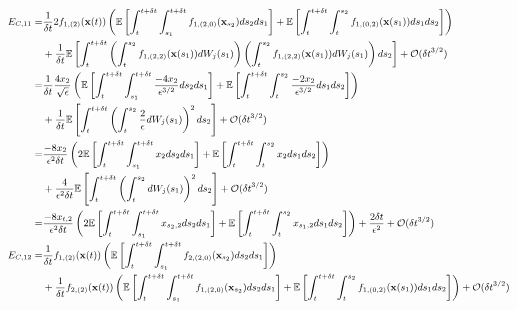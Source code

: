 \begin{equation}
\small
\begin{aligned}
E_{C,11}
=& 
\frac{1}{\delta t} 2 f_{1,(2)}(\mathbf{x}(t)) \left( \mathbb{E} \left[ \int_t^{t+\delta t} \int_{s_1}^{t+\delta t} f_{1,(2,0)}(\mathbf{x}_{s_2}) ds_2 ds_1 \right] 
+ \mathbb{E} \left[  \int_t^{t+\delta t} \int_t^{s_2} f_{1,(0,2)}(\mathbf{x}(s_1)) ds_1 ds_2\right] \right) \\
&+ \frac{1}{\delta t}  \mathbb{E} \left[ \int_t^{t+\delta t}\left( \int_t^{s_2} f_{1,(2,2)}(\mathbf{x}(s_1)) dW_j(s_1)  \right) \left(  \int_t^{s_2} f_{1,(2,2)}(\mathbf{x}(s_1)) dW_j(s_1) \right) ds_2 \right] 
+ \mathcal{O} (\delta t^{3/2}) \\
=& 
\frac{1}{\delta t}  \frac{4 x_2}{\sqrt{\epsilon}} \left( \mathbb{E} \left[ \int_t^{t+\delta t} \int_{s_1}^{t+\delta t} \frac{-4 x_2}{\epsilon^{3/2}} ds_2 ds_1 \right] 
+ \mathbb{E} \left[  \int_t^{t+\delta t} \int_t^{s_2} \frac{-2 x_2}{\epsilon^{3/2}} ds_1 ds_2\right] \right) \\
&+ \frac{1}{\delta t} \mathbb{E} \left[ \int_t^{t+\delta t}\left( \int_t^{s_2} \frac{2}{\epsilon} dW_j(s_1)  \right)^2 ds_2 \right] 
+ \mathcal{O} (\delta t^{3/2}) \\
=& 
\frac{-8 x_2}{\epsilon^2 \delta t} \left( 2 \mathbb{E} \left[ \int_t^{t+\delta t} \int_{s_1}^{t+\delta t} x_2 ds_2 ds_1 \right] 
+ \mathbb{E} \left[  \int_t^{t+\delta t} \int_t^{s_2} x_2 ds_1 ds_2\right] \right) \\
&+ \frac{4}{\epsilon^2 \delta t} \mathbb{E} \left[ \int_t^{t+\delta t}\left( \int_t^{s_2} dW_j(s_1)  \right)^2 ds_2 \right] 
+ \mathcal{O} (\delta t^{3/2}) \\
=& 
\frac{-8 x_{t,2}}{\epsilon^2 \delta t} \left( 2 \mathbb{E} \left[ \int_t^{t+\delta t} \int_{s_1}^{t+\delta t} x_{s_2,2} ds_2 ds_1 \right] 
+ \mathbb{E} \left[  \int_t^{t+\delta t} \int_t^{s_2} x_{s_1,2} ds_1 ds_2\right] \right) 
+ \frac{2 \delta t}{\epsilon^2} 
+ \mathcal{O} (\delta t^{3/2}) \\
%
E_{C, 12} 
=& 
\frac{1}{\delta t}  f_{1,(2)}(\mathbf{x}(t)) \left( \mathbb{E} \left[ \int_t^{t+\delta t} \int_{s_1}^{t+\delta t} f_{2,(2,0)}(\mathbf{x}_{s_2}) ds_2 ds_1 \right]  \right) \\
&+ \frac{1}{\delta t} f_{2,(2)}(\mathbf{x}(t)) \left( \mathbb{E} \left[ \int_t^{t+\delta t} \int_{s_1}^{t + \delta t} f_{1,(2,0)}(\mathbf{x}_{s_2}) ds_2 ds_1 \right]
+ \mathbb{E} \left[ \int_t^{t+\delta t} \int_t^{s_2} f_{1,(0,2)}(\mathbf{x}(s_1)) ds_1 ds_2 \right] \right) 
+ \mathcal{O} (\delta t^{3/2}) \\

\end{aligned}
\end{equation}
